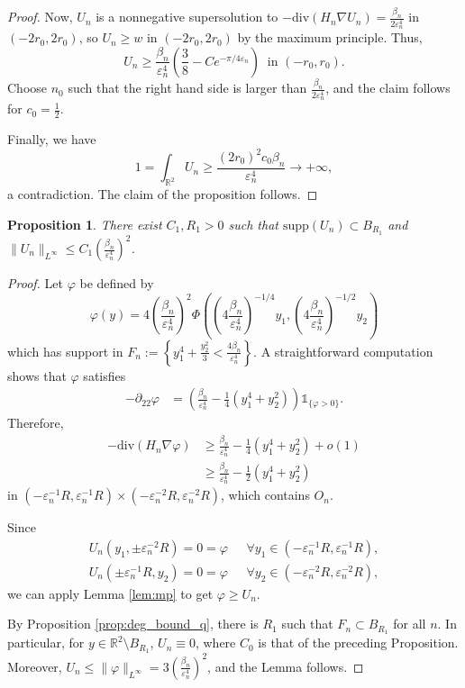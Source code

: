 \documentclass[10pt,a4paper]{article}
\newcommand{\RR}{\mathbb{R}}
\newcommand{\divg}{\mathrm{div}}
\newcommand{\supp}{\mathrm{supp}}
\newcommand{\faskip}{\hspace{8pt}}
\newtheorem{prop}[thm]{Proposition}
\numberwithin{equation}{section}
\begin{document}
\begin{proof}
Now, $U_{n}$ is a nonnegative supersolution to $- \divg(H_n\nabla U_{n}) = \frac{\beta_{n}}{2\varepsilon_{n}^{4}}$ in $(-2r_0, 2r_0)$, so $U_{n} \geq w$ in $ (-2r_0, 2r_0) $ by the maximum principle. Thus, 
\[U_{n} \geq \frac{\beta_{n}}{\varepsilon_n^{4}}\left( \frac{3}{8} - Ce^{-\pi/4\varepsilon_n} \right) ~ \text{ in } (-r_0, r_0). \]
Choose $ n_0 $ such that the right hand side is larger than $\frac{\beta_{n}}{2\varepsilon_n^{4}}$, and the claim follows for $c_0 = \frac{1}{2}$.

Finally, we have
\[1 = \int_{\RR^{2}} U_{n} \geq \frac{(2r_0)^{2} c_0 \beta_{n}}{\varepsilon_n^{4}} \rightarrow +\infty, \]
a contradiction. The claim of the proposition follows.
\end{proof}

\begin{prop}
	\label{lem:deg_infty_bd}
	There exist $C_1 , R_1 > 0$ such that $ \supp(U_n) \subset B_{R_1}$ and $ \|U_n\|_{L^{\infty}} \leq C_1 \left( \frac{\beta_n}{\varepsilon_n^{4}} \right)^2 $.
\end{prop}

\begin{proof}
	Let $ \varphi $ be defined by
	\[
		\varphi(y) = 4 \left( \frac{\beta_n}{\varepsilon_n^{4}} \right)^2 \Phi \left( \left( 4 \frac{\beta_n}{\varepsilon_n^{4}}\right)^{-1/4} y_1,  \left( 4 \frac{\beta_n}{\varepsilon_n^{4}}\right)^{-1/2} y_2 \right) 
	\]
	which has support in $ F_n := \left\{ y_1^{4} + \frac{y_2^{2}}{3} < \frac{4 \beta_n}{\varepsilon_n^{4}} \right\} $. A straightforward computation shows that $ \varphi $ satisfies 
	\begin{align*}
		-\partial_{22}\varphi &= \left( \frac{\beta_n}{\varepsilon_n^{4}} - \frac{1}{4}(y_1^{4} + y_2^{2}) \right) \mathbb{1}_{\{\varphi > 0 \}}.
	\end{align*}
	Therefore, 
	\begin{align*}
		-\divg(H_n\nabla \varphi) &\geq \frac{\beta_n}{\varepsilon_n^{4}} - \frac{1}{4}(y_1^{4} + y_2^2) + o(1) \\
					  &\geq \frac{\beta_n}{\varepsilon_n^{4}} - \frac{1}{2} (y_1^{4} + y_2^2)
	\end{align*}
	in $ (-\varepsilon_n^{-1}R, \varepsilon_n^{-1}R) \times (-\varepsilon_n^{-2}R, \varepsilon_n^{-2}R) $, which contains $ O_{n} $. 

	Since 
	\begin{align*}
		U_n(y_1, \pm \varepsilon_n^{-2}R) = 0 = \varphi & \faskip \forall y_1 \in (-\varepsilon_n^{-1}R, \varepsilon_n^{-1}R),\\ 
		U_n(\pm \varepsilon_n^{-1}R, y_2) = 0 = \varphi & \faskip \forall y_2 \in(-\varepsilon_n^{-2}R, \varepsilon_n^{-2}R),
	\end{align*}
	we can apply Lemma \ref{lem:mp} to get $ \varphi \geq U_n $.  

	By Proposition \ref{prop:deg_bound_q}, there is $ {R_1} $ such that $ F_n \subset B_{R_1} $ for all $ n $. In particular, for $ y \in \RR^{2} \setminus B_{R_1} $, $U_n \equiv 0$, where $ C_0 $ is that of the preceding Proposition. Moreover, $ U_n \leq \|\varphi\|_{L^{\infty}} = 3 \left( \frac{\beta_n}{\varepsilon_n^{4}} \right) ^{2}$, and the Lemma follows.
\end{proof}
\end{document}
